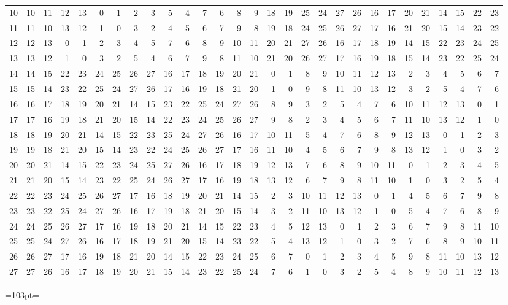\documentclass[10pt,a4paper]{article}
\newcommand{\needspace}[1]{\par\penalty-100\begingroup\dimen0=#1\relax\dimen2=\pagegoal
  \advance\dimen2-\pagetotal\ifdim\dimen0>\dimen2\relax\ifdim\dimen2>0pt\vfil\break\fi\fi
  \endgroup}
\numberwithin{equation}{section}
\begin{document}
{\begin{longtable}{@{}r|rrrrrrrrrrrrrrrrrrrrrrrrrrrr@{}}
10 & 10 & 11 & 12 & 13 & 0 & 1 & 2 & 3 & 5 & 4 & 7 & 6 & 8 & 9 & 18 & 19 & 25 & 24 & 27 & 26 & 16 & 17 & 20 & 21 & 14 & 15 & 22 & 23\\
11 & 11 & 10 & 13 & 12 & 1 & 0 & 3 & 2 & 4 & 5 & 6 & 7 & 9 & 8 & 19 & 18 & 24 & 25 & 26 & 27 & 17 & 16 & 21 & 20 & 15 & 14 & 23 & 22\\
12 & 12 & 13 & 0 & 1 & 2 & 3 & 4 & 5 & 7 & 6 & 8 & 9 & 10 & 11 & 20 & 21 & 27 & 26 & 16 & 17 & 18 & 19 & 14 & 15 & 22 & 23 & 24 & 25\\
13 & 13 & 12 & 1 & 0 & 3 & 2 & 5 & 4 & 6 & 7 & 9 & 8 & 11 & 10 & 21 & 20 & 26 & 27 & 17 & 16 & 19 & 18 & 15 & 14 & 23 & 22 & 25 & 24\\
14 & 14 & 15 & 22 & 23 & 24 & 25 & 26 & 27 & 16 & 17 & 18 & 19 & 20 & 21 & 0 & 1 & 8 & 9 & 10 & 11 & 12 & 13 & 2 & 3 & 4 & 5 & 6 & 7\\
15 & 15 & 14 & 23 & 22 & 25 & 24 & 27 & 26 & 17 & 16 & 19 & 18 & 21 & 20 & 1 & 0 & 9 & 8 & 11 & 10 & 13 & 12 & 3 & 2 & 5 & 4 & 7 & 6\\
16 & 16 & 17 & 18 & 19 & 20 & 21 & 14 & 15 & 23 & 22 & 25 & 24 & 27 & 26 & 8 & 9 & 3 & 2 & 5 & 4 & 7 & 6 & 10 & 11 & 12 & 13 & 0 & 1\\
17 & 17 & 16 & 19 & 18 & 21 & 20 & 15 & 14 & 22 & 23 & 24 & 25 & 26 & 27 & 9 & 8 & 2 & 3 & 4 & 5 & 6 & 7 & 11 & 10 & 13 & 12 & 1 & 0\\
18 & 18 & 19 & 20 & 21 & 14 & 15 & 22 & 23 & 25 & 24 & 27 & 26 & 16 & 17 & 10 & 11 & 5 & 4 & 7 & 6 & 8 & 9 & 12 & 13 & 0 & 1 & 2 & 3\\
19 & 19 & 18 & 21 & 20 & 15 & 14 & 23 & 22 & 24 & 25 & 26 & 27 & 17 & 16 & 11 & 10 & 4 & 5 & 6 & 7 & 9 & 8 & 13 & 12 & 1 & 0 & 3 & 2\\
20 & 20 & 21 & 14 & 15 & 22 & 23 & 24 & 25 & 27 & 26 & 16 & 17 & 18 & 19 & 12 & 13 & 7 & 6 & 8 & 9 & 10 & 11 & 0 & 1 & 2 & 3 & 4 & 5\\
21 & 21 & 20 & 15 & 14 & 23 & 22 & 25 & 24 & 26 & 27 & 17 & 16 & 19 & 18 & 13 & 12 & 6 & 7 & 9 & 8 & 11 & 10 & 1 & 0 & 3 & 2 & 5 & 4\\
22 & 22 & 23 & 24 & 25 & 26 & 27 & 17 & 16 & 18 & 19 & 20 & 21 & 14 & 15 & 2 & 3 & 10 & 11 & 12 & 13 & 0 & 1 & 4 & 5 & 6 & 7 & 9 & 8\\
23 & 23 & 22 & 25 & 24 & 27 & 26 & 16 & 17 & 19 & 18 & 21 & 20 & 15 & 14 & 3 & 2 & 11 & 10 & 13 & 12 & 1 & 0 & 5 & 4 & 7 & 6 & 8 & 9\\
24 & 24 & 25 & 26 & 27 & 17 & 16 & 19 & 18 & 20 & 21 & 14 & 15 & 22 & 23 & 4 & 5 & 12 & 13 & 0 & 1 & 2 & 3 & 6 & 7 & 9 & 8 & 11 & 10\\
25 & 25 & 24 & 27 & 26 & 16 & 17 & 18 & 19 & 21 & 20 & 15 & 14 & 23 & 22 & 5 & 4 & 13 & 12 & 1 & 0 & 3 & 2 & 7 & 6 & 8 & 9 & 10 & 11\\
26 & 26 & 27 & 17 & 16 & 19 & 18 & 21 & 20 & 14 & 15 & 22 & 23 & 24 & 25 & 6 & 7 & 0 & 1 & 2 & 3 & 4 & 5 & 9 & 8 & 11 & 10 & 13 & 12\\*
27 & 27 & 26 & 16 & 17 & 18 & 19 & 20 & 21 & 15 & 14 & 23 & 22 & 25 & 24 & 7 & 6 & 1 & 0 & 3 & 2 & 5 & 4 & 8 & 9 & 10 & 11 & 12 & 13\\
\bottomrule\end{longtable}}
\needspace{103pt}
\end{document}
